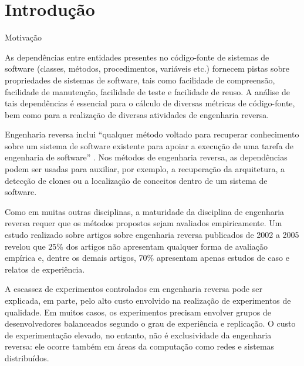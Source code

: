 %

\chapter{Introdução}

\begin{section}{Motivação}


	As dependências entre entidades presentes no código-fonte de sistemas de software (classes, métodos, procedimentos, variáveis etc.) fornecem pistas sobre propriedades de sistemas de software, tais como facilidade de compreensão, facilidade de manutenção, facilidade de teste e facilidade de reuso. 
	A análise de tais dependências é essencial para o cálculo de diversas métricas de código-fonte, bem como para a realização de diversas atividades de engenharia reversa.

	Engenharia reversa inclui ``qualquer método voltado para recuperar conhecimento sobre um sistema de software existente para apoiar a execução de uma tarefa de engenharia de software'' \cite{Tonella2007}. Nos métodos de engenharia reversa, as dependências podem ser usadas para auxiliar, por exemplo, a recuperação da arquitetura, a detecção de clones ou a localização de conceitos dentro de um sistema de software. 

	Como em muitas outras disciplinas, a maturidade da disciplina de engenharia reversa requer que os métodos propostos sejam avaliados empiricamente. Um estudo realizado sobre artigos sobre engenharia reversa publicados de 2002 a 2005 revelou que 25\% dos artigos não apresentam qualquer forma de avaliação empírica e, dentre os demais artigos, 70\% apresentam apenas estudos de caso e relatos de experiência.

	A escassez de experimentos controlados em engenharia reversa pode ser explicada, em parte, pelo alto custo envolvido na realização de experimentos de qualidade. Em muitos casos, os experimentos precisam envolver grupos de desenvolvedores balanceados segundo o grau de experiência e replicação. O custo de experimentação elevado, no entanto, não é exclusividade da engenharia reversa: ele ocorre também em áreas da computação como redes e sistemas distribuídos.


\end{section}
